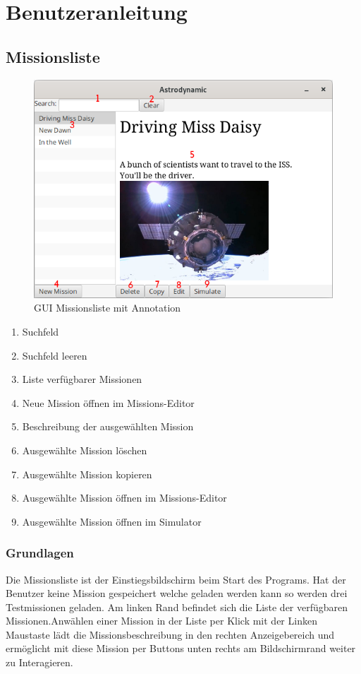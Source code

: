 \chapter{Benutzeranleitung}

\section{Missionsliste}

\begin{figure}[H]
	\includegraphics[width=12cm]{res/missionsliste.png}
	\caption{GUI Missionsliste mit Annotation}
\end{figure}

\begin{enumerate}
	\item Suchfeld
	\item Suchfeld leeren
	\item Liste verfügbarer Missionen
	\item Neue Mission öffnen im Missions-Editor
	\item Beschreibung der ausgewählten Mission
	\item Ausgewählte Mission löschen
	\item Ausgewählte Mission kopieren
	\item Ausgewählte Mission öffnen im Missions-Editor
	\item Ausgewählte Mission öffnen im Simulator
\end{enumerate}

\subsection{Grundlagen}
Die Missionsliste ist der Einstiegsbildschirm beim Start des Programs.
Hat der Benutzer keine Mission gespeichert welche geladen werden kann so werden drei Testmissionen geladen.
Am linken Rand befindet sich die Liste der verfügbaren Missionen.Anwählen einer Mission in der Liste per Klick mit der Linken Maustaste lädt die Missionsbeschreibung in den rechten Anzeigebereich und ermöglicht mit diese Mission per Buttons unten rechts am Bildschirmrand weiter zu Interagieren.

